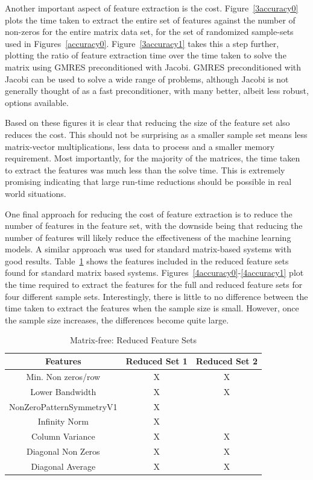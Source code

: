 Another important aspect of feature extraction is the cost. Figure~\ref{3accuracy0} plots the time taken to extract the entire set of features against the number of non-zeros for the entire matrix data set, for the set of randomized sample-sets used in Figures~\ref{accuracy0}. Figure~\ref{3accuracy1} takes this a step further, plotting the ratio of feature extraction time over the time taken to solve the matrix using GMRES preconditioned with Jacobi. GMRES preconditioned with Jacobi can be used to solve a wide range of problems, although Jacobi is not generally thought of as a fast preconditioner, with many better, albeit less robust, options available.  

Based on these figures it is clear that reducing the size of the feature set also reduces the cost. This should not be surprising as a smaller sample set means less matrix-vector multiplications, less data to process and a smaller memory requirement. Most importantly, for the majority of the matrices, the time taken to extract the features was much less than the solve time. This is extremely promising indicating that large run-time reductions should be possible in real world situations. 

One final approach for reducing the cost of feature extraction is to reduce the number of features in the feature set, with the downside being that reducing the number of features will likely reduce the effectiveness of the machine learning models. A similar approach was used for standard matrix-based systems with good results. Table~\ref{reduced_sets} shows the features included in the reduced feature sets found for standard matrix based systems. Figures~\ref{4accuracy0}-\ref{4accuracy1} plot the time required to extract the features for the full and reduced feature sets for four different sample sets. Interestingly, there is little to no difference between the time taken to extract the features when the sample size is small. However, once the sample size increases, the differences become quite large. 

\begin{table}[thb]
\centering
\caption{Matrix-free: Reduced Feature Sets}
\label{reduced_sets}
\begin{tabular}{|c|c|c|}    \hline  
Features                   & Reduced Set 1  & Reduced Set 2 \\ \hline\hline
Min. Non zeros/row         & X              & X             \\ \hline
Lower Bandwidth            & X              & X             \\ \hline
NonZeroPatternSymmetryV1   & X              &               \\ \hline
Infinity Norm              & X              &               \\ \hline
Column Variance            & X              & X             \\ \hline
Diagonal Non Zeros         & X              & X             \\ \hline
Diagonal Average           & X              & X             \\ \hline
\end{tabular}
\end{table}

